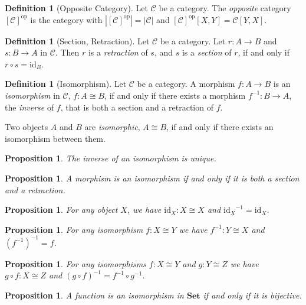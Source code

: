 \documentclass{book}
\newtheorem{proposition}[lemma]{Proposition}
\theoremstyle{definition}
\newtheorem{definition}[lemma]{Definition}
\newcommand{\CC}{\ensuremath{\mathcal{C}}}
\newcommand{\id}[1]{\ensuremath{\mathrm{id}_{#1}}}
\newcommand{\inv}[1]{\ensuremath{{#1}^{-1}}}
\newcommand{\op}[1]{\ensuremath{[#1]^{\mathrm{op}}}}
\newcommand{\Set}{\ensuremath{\mathbf{Set}}}
\begin{document}
\begin{definition}[Opposite Category]
    Let $\CC$ be a category. The \emph{opposite} category $\op{\CC}$ is the category with
    $|\op{\CC}| = |\CC|$ and $\op{\CC}[X,Y] = \CC[Y,X]$.
\end{definition}

\begin{definition}[Section, Retraction]
    Let $\CC$ be a category.
    Let $r : A \rightarrow B$ and $s : B \rightarrow A$ in $\CC$. Then $r$ is a \emph{retraction} of $s$,
    and $s$ is a \emph{section} of $r$, if and only if $r \circ s = \id{B}$.
\end{definition}

\begin{definition}[Isomorphism]
    Let $\CC$ be a category. A morphism $f : A \rightarrow B$ is an \emph{isomorphism} in $\CC$, $f : A \cong B$,
    if and only if there exists a morphism $\inv{f} : B \rightarrow A$, the \emph{inverse} of $f$, that is both
    a section and a retraction of $f$.

    Two objects $A$ and $B$ are \emph{isomorphic}, $A \cong B$, if and only if there exists an isomorphism between them.
\end{definition}

\begin{proposition}
    The inverse of an isomorphism is unique.
\end{proposition}

\begin{proposition}
    A morphism is an isomorphism if and only if it is both a section and a retraction.
\end{proposition}

\begin{proposition}
    For any object $X$, we have $\id{X} : X \cong X$ and $\inv{\id{X}} = \id{X}$.
\end{proposition}

\begin{proposition}
    For any isomorphism $f : X \cong Y$ we have $\inv{f} : Y \cong X$ and $\inv{(\inv{f})} = f$.
\end{proposition}

\begin{proposition}
    For any isomorphisms $f : X \cong Y$ and $g : Y \cong Z$ we have $g \circ f : X \cong Z$
    and $\inv{(g \circ f)} = \inv{f} \circ \inv{g}$.
\end{proposition}

\begin{proposition}
    A function is an isomorphism in $\Set$ if and only if it is bijective.
\end{proposition}
\end{document}
